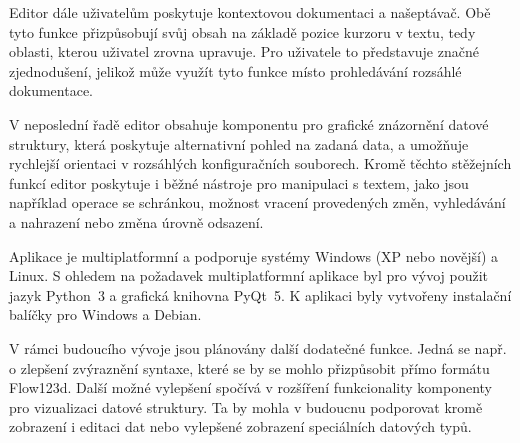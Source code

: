 \documentclass[FM,DP]{tulthesis}
\begin{document}
Editor dále uživatelům poskytuje kontextovou dokumentaci a našeptávač. Obě tyto funkce přizpůsobují svůj obsah na základě pozice kurzoru v textu, tedy oblasti, kterou uživatel zrovna upravuje. Pro uživatele to představuje značné zjednodušení, jelikož může využít tyto funkce místo prohledávání rozsáhlé dokumentace.

V neposlední řadě editor obsahuje komponentu pro grafické znázornění datové struktury, která poskytuje alternativní pohled na zadaná data, a umožňuje rychlejší orientaci v rozsáhlých konfiguračních souborech. Kromě těchto stěžejních funkcí editor poskytuje i běžné nástroje pro manipulaci s textem, jako jsou například operace se schránkou, možnost vracení provedených změn, vyhledávání a nahrazení nebo změna úrovně odsazení.

Aplikace je multiplatformní a podporuje systémy Windows (XP nebo novější) a Linux. S ohledem na požadavek multiplatformní aplikace byl pro vývoj použit jazyk Python~3 a grafická knihovna PyQt~5. K aplikaci byly vytvořeny instalační balíčky pro Windows a Debian.

V rámci budoucího vývoje jsou plánovány další dodatečné funkce. Jedná se např. o zlepšení zvýraznění syntaxe, které se by se mohlo přizpůsobit přímo formátu Flow123d. Další možné vylepšení spočívá v rozšíření funkcionality komponenty pro vizualizaci datové struktury. Ta by mohla v budoucnu podporovat kromě zobrazení i editaci dat nebo vylepšené zobrazení speciálních datových typů.
\end{document}
